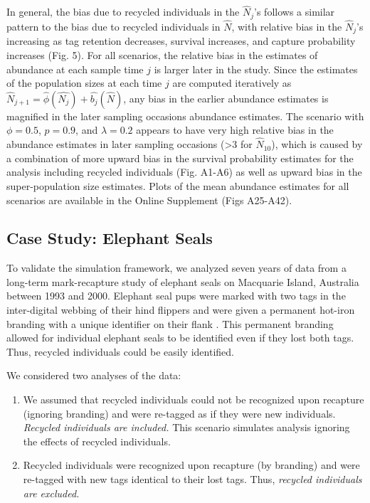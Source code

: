 \documentclass[12pt]{article}
\begin{document}
In general, the bias due to recycled individuals in the \(\hat{N}_j\)'s
follows a similar pattern to the bias due to recycled individuals in
\(\hat{N}\), with relative bias in the \(\hat{N}_j\)'s increasing as tag
retention decreases, survival increases, and capture probability
increases (Fig. 5). For all scenarios, the relative bias in the
estimates of abundance at each sample time \(j\) is larger later in the study. Since the
estimates of the population sizes at each time \(j\) are computed
iteratively as
\(\hat{N}_{j+1}=\hat{\phi}(\hat{N_j})+\hat{b_j}(\hat{N})\), any bias in
the earlier abundance estimates is magnified in the later sampling
occasions abundance estimates. The scenario with \(\phi=0.5\),
\(p=0.9\), and \(\lambda=0.2\) appears to have very high relative bias
in the abundance estimates in later sampling occasions (\textgreater{}3
for \(\hat{N}_{10}\)), which is caused by a combination of more upward
bias in the survival probability estimates for the analysis including recycled
individuals  (Fig. A1-A6) as well as upward bias in the
super-population size estimates. Plots of the mean abundance estimates
for all scenarios are available in the Online Supplement (Figs A25-A42).

\subsection{Case Study: Elephant
Seals}\label{case-study-elephant-seals-1}


To validate the simulation framework, we analyzed seven years of data from a long-term mark-recapture study of elephant seals on Macquarie Island, Australia between 1993 and 2000. 
Elephant seal pups were marked with two tags in the inter-digital
webbing of their hind flippers and were given a permanent hot-iron
branding with a unique identifier on their flank \citep{McMahon:2009}. This
permanent branding allowed for individual elephant seals to be
identified even if they lost both tags. Thus, recycled individuals could
be easily identified.

We considered two analyses of the data:

\begin{enumerate}
\def\labelenumi{\arabic{enumi}.}
\item
  We assumed that recycled individuals could not be recognized upon
  recapture (ignoring branding) and were re-tagged as if they were new
  individuals.  \textit{ Recycled individuals are included.} This scenario simulates analysis ignoring the effects of recycled individuals. 
\item
  Recycled individuals were recognized upon recapture (by branding) and were re-tagged with new tags identical to their lost tags. Thus, \textit{recycled individuals are excluded.} 
\end{enumerate}
\end{document}
